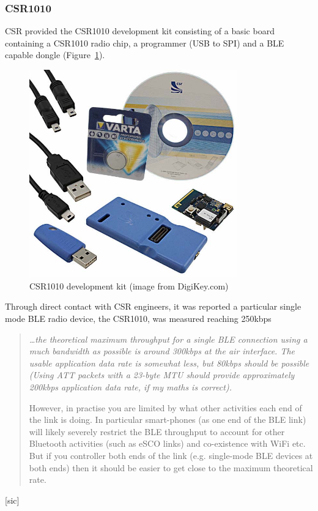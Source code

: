 \documentclass[]{article}
\begin{document}
\clearpage

\subsubsection{CSR1010}
\ac{CSR} provided the CSR1010 development kit consisting of a basic board containing a CSR1010 radio chip, a programmer (USB to \ac{SPI}) and  a \ac{BLE} capable dongle (Figure~\ref{fig:csrdevkit}). 

\begin{figure}[H]
	\begin{center}
		\includegraphics[width = 0.8\textwidth]{csrdevkit}
	\end{center}
	\caption{CSR1010 development kit (image from DigiKey.com)}
	\label{fig:csrdevkit}
\end{figure}

Through direct contact with \ac{CSR} engineers, it was reported a particular single mode \ac{BLE} radio device, the CSR1010, was measured reaching 250kbps

\begin{quote}\itshape \ldots the theoretical maximum throughput for a single BLE 
connection using a much bandwidth as possible is around 300kbps at the 
air interface. The usable application data rate is somewhat less, but 
80kbps should be possible (Using ATT packets with a 23-byte MTU should 
provide approximately 200kbps application data rate, if my maths is 
correct).

However, in practise you are limited by what other activities each end 
of the link is doing. In particular smart-phones (as one end of the BLE 
link) will likely severely restrict the BLE throughput to account for 
other Bluetooth activities (such as eSCO links) and co-existence with 
WiFi etc. But if you controller both ends of the link (e.g. single-mode 
BLE devices at both ends) then it should be easier to get close to the 
maximum theoretical rate.  \text{ \textnormal{[sic]}}
\end{quote}[sic]
\end{document}
